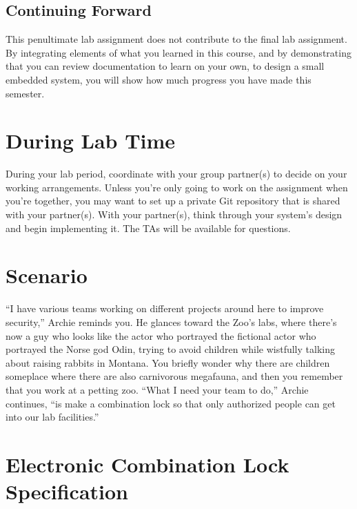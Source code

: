 \subsection*{Continuing Forward}

This penultimate lab assignment does not contribute to the final lab assignment.
By integrating elements of what you learned in this course, and by demonstrating
that you can review documentation to learn on your own, to design a small
embedded system, you will show how much progress you have made this semester.

\section*{During Lab Time}

During your lab period, coordinate with your group partner(s) to decide on your
working arrangements. Unless you're only going to work on the assignment when
you're together, you may want to set up a private Git repository that is shared
with your partner(s). With your partner(s), think through your system's design
and begin implementing it. The TAs will be available for questions.

\softwareengineeringfrontmatter

\section{Scenario}

``I have various teams working on different projects around here to improve
security,'' Archie reminds you. He glances toward the Zoo's labs, where there's
now a guy who looks like the actor who portrayed the fictional actor who
portrayed the Norse god Odin, trying to avoid children while wistfully talking
about raising rabbits in Montana. You briefly wonder why there are children
someplace where there are also carnivorous megafauna, and then you remember that
you work at a petting zoo. ``What I need your team to do,'' Archie continues,
``is make a combination lock so that only authorized people can get into our lab
facilities.''

\section{Electronic Combination Lock Specification} \label{sec:FunctionalSpecification}

